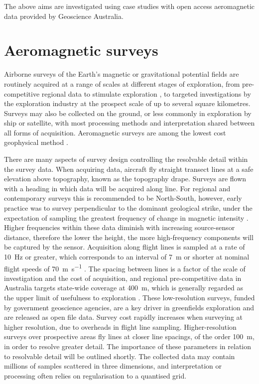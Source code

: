 The above aims are investigated using case studies with open access aeromagnetic data provided by Geoscience Australia.

\section{Aeromagnetic surveys}
\label{sec:introgeo}
Airborne surveys of the Earth's magnetic or gravitational potential fields are routinely acquired at a range of scales at different stages of exploration, from pre-competitive regional data to stimulate exploration \parencite{howardAirborneGeophysicalCoverage2004}, to targeted investigations by the exploration industry at the prospect scale of up to several square kilometres.
Surveys may also be collected on the ground, or less commonly in exploration by ship or satellite, with most processing methods and interpretation shared between all forms of acquisition.
Aeromagnetic surveys are among the lowest cost geophysical method \parencite{dentithGeophysicsMineralExploration2014}.

There are many aspects of survey design controlling the resolvable detail within the survey data.
When acquiring data, aircraft fly straight transect lines at a safe elevation above topography, known as the topography drape.
Surveys are flown with a heading in which data will be acquired along line.
For regional and contemporary surveys this is recommended to be North-South, however, early practice was to survey perpendicular to the dominant geological strike, under the expectation of sampling the greatest frequency of change in magnetic intensity \parencite{islesGeologicalInterpretationAeromagnetic2018}.
Higher frequencies within these data diminish with increasing source-sensor distance, therefore the lower the height, the more high-frequency components will be captured by the sensor.
Acquisition along flight lines is sampled at a rate of \qty{10}{\hertz} or greater, which corresponds to an interval of \qty{7}{\m} or shorter at nominal flight speeds of \qty{70}{\m\per\s} \parencite{goodwinAirborneMagneticRadiometric2023}.
The spacing between lines is a factor of the scale of investigation and the cost of acquisition, and regional pre-competitive data in Australia targets state-wide coverage at \qty{400}{\m}, which is generally regarded as the upper limit of usefulness to exploration \parencite{howardAirborneGeophysicalCoverage2004}.
These low-resolution surveys, funded by government geoscience agencies, are a key driver in greenfields exploration and are released as open file data.
Survey cost rapidly increases when surveying at higher resolution, due to overheads in flight line sampling.
Higher-resolution surveys over prospective areas fly lines at closer line spacings, of the order \qty{100}{\m}, in order to resolve greater detail.
The importance of these parameters in relation to resolvable detail will be outlined shortly.
The collected data may contain millions of samples scattered in three dimensions, and interpretation or processing often relies on regularisation to a quantised grid.

